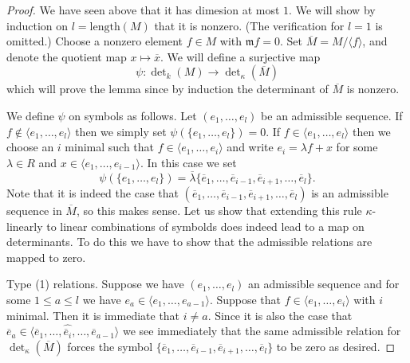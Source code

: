 \begin{proof}
We have seen above that it has dimesion at most $1$.
We will show by induction on $l = \text{length}(M)$
that it is nonzero. (The verification for $l = 1$ is omitted.)
Choose a nonzero element $f \in M$
with $\mathfrak m f = 0$. Set $\overline{M} = M /\langle f \rangle$,
and denote the quotient map $x \mapsto \overline{x}$.
We will define a surjective map
$$
\psi : \det\nolimits_k(M) \to \det\nolimits_\kappa(\overline{M})
$$
which will prove the lemma since by induction the determinant of
$\overline{M}$ is nonzero.

\medskip\noindent
We define $\psi$ on symbols as follows.
Let $(e_1, \ldots, e_l)$ be an admissible sequence.
If $f \not \in \langle e_1, \ldots, e_l \rangle$ then 
we simply set $\psi(\{e_1, \ldots, e_l\}) = 0$.
If $f \in \langle e_1, \ldots, e_l \rangle$ then we choose
an $i$ minimal such that $f \in \langle e_1, \ldots, e_i \rangle$
and write $e_i = \lambda f + x$ for some $\lambda \in R$
and $x \in \langle e_1, \ldots, e_{i - 1} \rangle$.
In this case we set
$$
\psi(\{e_1, \ldots, e_l\}) =
\overline{\lambda}\{\overline{e}_1, \ldots,
\overline{e}_{i - 1},
\overline{e}_{i + 1}, \ldots, \overline{e}_l\}.
$$
Note that it is indeed the case that
$(\overline{e}_1, \ldots,
\overline{e}_{i - 1},
\overline{e}_{i + 1}, \ldots, \overline{e}_l)$
is an admissible sequence in $\overline{M}$, so this makes sense.
Let us show that extending this rule $\kappa$-linearly to
linear combinations of symbolds does indeed lead to a map on
determinants. To do this we have to show that the admissible
relations are mapped to zero.

\medskip\noindent
Type (1) relations. Suppose we have $(e_1, \ldots, e_l)$ an
admissible sequence and for some $1 \leq a \leq l$ we have
$e_a \in \langle e_1, \ldots, e_{a - 1}\rangle$.
Suppose that $f \in \langle e_1, \ldots, e_i\rangle$ with $i$ minimal.
Then it is immediate that $i \not = a$. Since it is also
the case that
$\overline{e}_a \in
\langle \overline{e}_1, \ldots, \hat{\overline{e}_i}, \ldots,
\overline{e}_{a - 1}\rangle$ we see immediately that the same
admissible relation for $\det_\kappa(\overline{M})$ forces
the symbol $\{\overline{e}_1, \ldots,
\overline{e}_{i - 1},
\overline{e}_{i + 1}, \ldots, \overline{e}_l\}$
to be zero as desired.


\end{proof}
